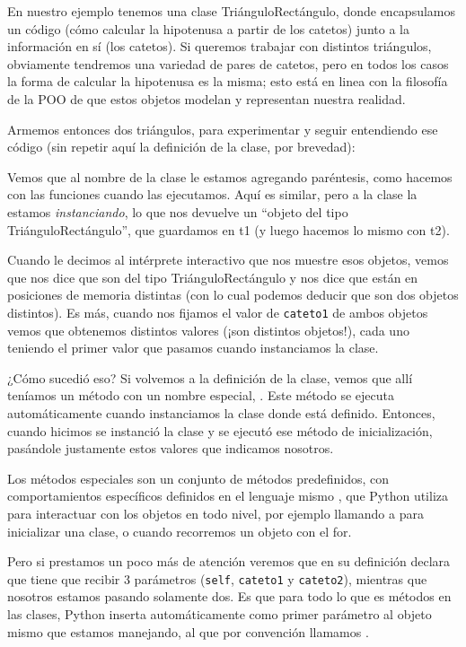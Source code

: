 En nuestro ejemplo tenemos una clase TriánguloRectángulo, donde encapsulamos un código (cómo calcular la hipotenusa a partir de los catetos) junto a la información en sí (los catetos). Si queremos trabajar con distintos triángulos, obviamente tendremos una variedad de pares de catetos, pero en todos los casos la forma de calcular la hipotenusa es la misma; esto está en linea con la filosofía de la POO de que estos objetos modelan y representan nuestra realidad.

Armemos entonces dos triángulos, para experimentar y seguir entendiendo ese código (sin repetir aquí la definición de la clase, por brevedad):


Vemos que al nombre de la clase le estamos agregando paréntesis, como hacemos con las funciones cuando las ejecutamos. Aquí es similar, pero a la clase la estamos \textit{instanciando}, lo que nos devuelve un ``objeto del tipo TriánguloRectángulo'', que guardamos en t1 (y luego hacemos lo mismo con t2).

Cuando le decimos al intérprete interactivo que nos muestre esos objetos, vemos que nos dice que son del tipo TriánguloRectángulo y nos dice que están en posiciones de memoria distintas (con lo cual podemos deducir que son dos objetos distintos). Es más, cuando nos fijamos el valor de \verb|cateto1| de ambos objetos vemos que obtenemos distintos valores (¡son distintos objetos!), cada uno teniendo el primer valor que pasamos cuando instanciamos la clase. 

¿Cómo sucedió eso? Si volvemos a la definición de la clase, vemos que allí teníamos un método con un nombre especial, . Este método se ejecuta automáticamente cuando instanciamos la clase donde está definido. Entonces, cuando hicimos  se instanció la clase y se ejecutó ese método de inicialización, pasándole justamente estos valores que indicamos nosotros.

\begin{info}
Los métodos especiales son un conjunto de métodos predefinidos, con comportamientos específicos definidos en el lenguaje mismo \cite{metodos_especiales}, que Python utiliza para interactuar con los objetos en todo nivel, por ejemplo llamando a  para inicializar una clase, o  cuando recorremos un objeto con el {for}.
\end{info}

Pero si prestamos un poco más de atención veremos que en su definición  declara que tiene que recibir 3 parámetros (\verb|self|, \verb|cateto1| y \verb|cateto2|), mientras que nosotros estamos pasando solamente dos. Es que para todo lo que es métodos en las clases, Python inserta automáticamente como primer parámetro al objeto mismo que estamos manejando, al que por convención llamamos .

